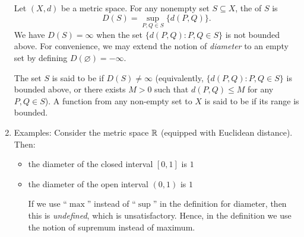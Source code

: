 \begin{enumerate}
Let \((X,d)\) be a metric space. For any nonempty set \(S\subseteq X\), the
 of \(S\) is
\[
D(S)=\sup_{P,Q\in S}\{d(P,Q)\}.
\]
We have \(D(S)=\infty\) when the set \(\{d(P,Q):P,Q\in S\}\) is not bounded
above. For convenience, we may extend the notion of \emph{diameter} to an empty
set by defining \(D(\varnothing)=-\infty\).

The set \(S\) is said to be  if \(D(S)\ne\infty\) (equivalently,
\(\{d(P,Q):P,Q\in S\}\) is bounded above, or there exists \(M>0\) such that
\(d(P,Q)\le M\) for any \(P,Q\in S\)). A function from any non-empty set to \(X\)
is said to be  if its range is bounded.

\item Examples: Consider the metric space \(\mathbb{R}\) (equipped with Euclidean
distance). Then:
\begin{itemize}
\item the diameter of the closed interval \([0,1]\) is \(1\)
\item the diameter of the open interval \((0,1)\) is \(1\) \begin{note}
If we use ``\(\max\)'' instead of ``\(\sup\)'' in the definition for diameter,
then this is \emph{undefined}, which is unsatisfactory. Hence, in the
definition we use the notion of supremum instead of maximum.
\end{note}
\end{itemize}
\end{enumerate}
